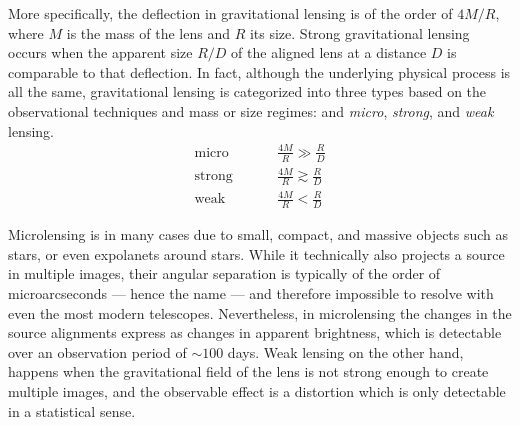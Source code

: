 More specifically, the deflection in gravitational lensing is of the order of
$4M/R$, where $M$ is the mass of the lens and $R$ its size.  Strong
gravitational lensing occurs when the apparent size $R/D$ of the aligned lens at
a distance $D$ is comparable to that deflection.  In fact, although the
underlying physical process is all the same, gravitational lensing is
categorized into three types based on the observational techniques and mass or
size regimes: and \textit{micro}, \textit{strong}, and \textit{weak} lensing.
%
\begin{equation}%
  \begin{aligned}
    \text{micro} \hspace{1cm}&\frac{4M}{R} \gg \frac{R}{D}\\
    \text{strong} \hspace{1cm}&\frac{4M}{R} \gtrsim \frac{R}{D}\\
    \text{weak} \hspace{1cm}&\frac{4M}{R} < \frac{R}{D}
  \end{aligned}
\end{equation}%
%

Microlensing is in many cases due to small, compact, and massive objects such as
stars, or even expolanets around stars.  While it technically also projects a
source in multiple images, their angular separation is typically of the order of
microarcseconds --- hence the name --- and therefore impossible to resolve with
even the most modern telescopes. Nevertheless, in microlensing the changes in
the source alignments express as changes in apparent brightness, which is
detectable over an observation period of $\sim100$ days.  Weak lensing on the
other hand, happens when the gravitational field of the lens is not strong
enough to create multiple images, and the observable effect is a distortion
which is only detectable in a statistical sense.

